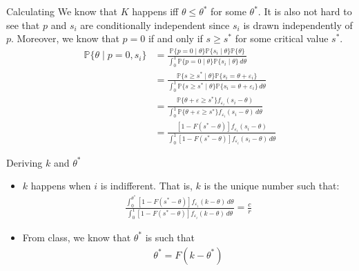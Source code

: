 \documentclass{beamer}
\newcommand{\bbP}{\mathbb{P}}
\begin{document}
\begin{frame}{Calculating}
We know that $K$ happens iff $\theta \leq \theta^*$ for some $\theta^*.$ It is also not hard to see that $p$ and $s_i$ are conditionally independent since $s_i$ is drawn independently of $p.$ Moreover, we know that $p = 0$ if and only if $s\geq s^*$ for some critical value $s^*.$
\begin{align*}
    \bbP\{\theta \mid p = 0, s_i\} &= \frac{\bbP\{p = 0\mid \theta\}\bbP\{s_i \mid \theta\}\bbP\{\theta\}}{\int_0^1\bbP\{p = 0 \mid \theta\}\bbP\{s_i \mid \theta\}\,d\theta}\\
    &= \frac{\bbP\{s \geq s^* \mid \theta\}\bbP\{s_i = \theta + \varepsilon_i\}}{\int_0^1 \bbP\{s \geq s^* \mid \theta\}\bbP\{s_i = \theta + \varepsilon_i\}\,d\theta}\\
    &= \frac{\bbP\{\theta  + \varepsilon \geq s^*\}f_{\varepsilon_i}(s_i - \theta)}{\int_0^1\bbP\{\theta  + \varepsilon \geq s^*\}f_{\varepsilon_i}(s_i - \theta)\,d\theta}\\
    &= \frac{\left[1 - F(s^* - \theta)\right]f_{\varepsilon_i}(s_i - \theta)}{\int_0^1\left[1 - F(s^* - \theta)\right]f_{\varepsilon_i}(s_i - \theta)\,d\theta}
\end{align*}
\end{frame}
\begin{frame}{Deriving $k$ and $\theta^*$}
\begin{itemize}
    \item $k$ happens when $i$ is indifferent. That is, $k$ is the unique number such that:
    \begin{align}
    \frac{\int_0^{\theta^*}\left[1 - F(s^* - \theta)\right]f_{\varepsilon_i}(k - \theta)\,d\theta}{\int_0^1\left[1 - F(s^* - \theta)\right]f_{\varepsilon_i}(k - \theta)\,d\theta} = \frac{c}{r}    
    \end{align}
    
    \item From class, we know that $\theta^*$ is such that 
    \begin{align}
    \theta^* = F(k - \theta^*)    
    \end{align}
    
\end{itemize}
\end{frame}
\end{document}
